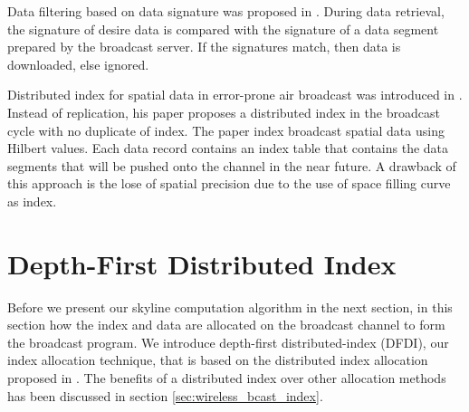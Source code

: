 \documentclass{sig-alternate}
\begin{document}
Data filtering based on data signature was proposed in \cite{signature_and_caching}.
During data retrieval, the signature of desire data is compared with the
signature of a data segment prepared by the broadcast server. If the signatures
match, then data is downloaded, else ignored.

Distributed index for spatial data in error-prone air broadcast was
introduced in \cite{dsi}. Instead of replication, his paper proposes a
distributed index in the broadcast cycle with no duplicate of index.
The paper index broadcast spatial data using Hilbert values. Each
data record contains an index table that contains the data segments
that will be pushed onto the channel in the near future. A drawback of
this approach is the lose of spatial precision due to the use of space
filling curve as index.





\section{Depth-First Distributed Index}

Before we present our skyline computation algorithm in the next section,
in this section how the index and data are allocated on the broadcast
channel to form the broadcast program. We introduce depth-first
distributed-index (DFDI), our index allocation technique, that is based on the
distributed index allocation proposed in \cite{data_on_air}. The benefits
of a distributed index over other allocation methods has been discussed in
section  \ref{sec:wireless_bcast_index}.
\end{document}

